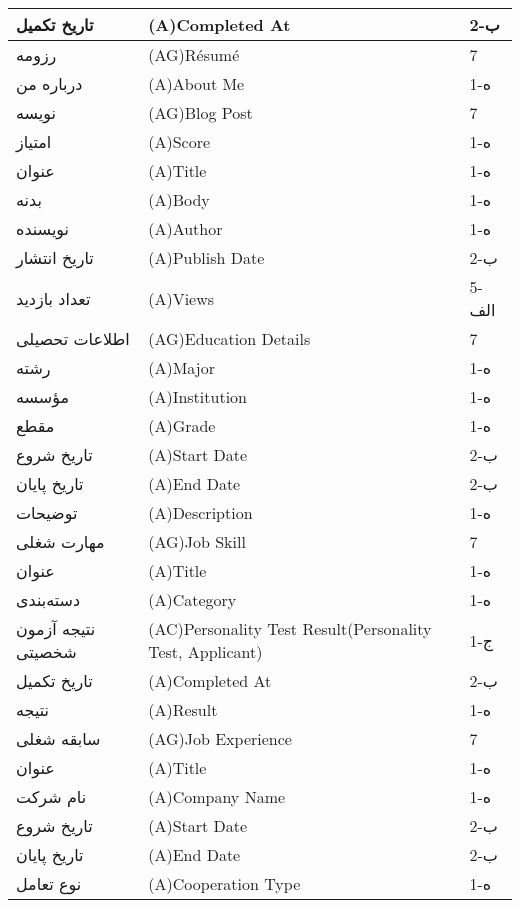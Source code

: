 \documentclass[12pt]{article}
\begin{document}
\begin{center}
\begin{table}[]
\begin{tabular}{|l|l|l|}
				\hline
				تاریخ تکمیل & (A)Completed At & 2-ب   \\
				\hline
				رزومه & (AG)Résumé & 7     \\
				\hline
				درباره من & (A)About Me & 1-ه   \\
				\hline
				نویسه & (AG)Blog Post & 7     \\
				\hline
				امتیاز & (A)Score & 1-ه   \\
				\hline
				عنوان & (A)Title & 1-ه   \\
				\hline
				بدنه & (A)Body & 1-ه   \\
				\hline
				نویسنده & (A)Author & 1-ه   \\
				\hline
				تاریخ انتشار & (A)Publish Date & 2-ب   \\
				\hline
				تعداد بازدید & (A)Views & 5-الف \\
				\hline
				اطلاعات تحصیلی & (AG)Education Details & 7     \\
				\hline
				رشته & (A)Major & 1-ه   \\
				\hline
				مؤسسه & (A)Institution & 1-ه   \\
				\hline
				مقطع & (A)Grade & 1-ه   \\
				\hline
				تاریخ شروع & (A)Start Date & 2-ب   \\
				\hline
				تاریخ پایان & (A)End Date & 2-ب   \\
				\hline
				توضیحات & (A)Description & 1-ه   \\
				\hline
				مهارت شغلی & (AG)Job Skill & 7     \\
				\hline
				عنوان & (A)Title & 1-ه   \\
				\hline
				دسته‌بندی & (A)Category & 1-ه   \\
				\hline
				نتیجه آزمون شخصیتی & (AC)Personality Test Result(Personality Test, Applicant) & 1-ج   \\
				\hline
				تاریخ تکمیل & (A)Completed At & 2-ب   \\
				\hline
				نتیجه & (A)Result & 1-ه   \\
				\hline
				سابقه شغلی & (AG)Job Experience & 7     \\
				\hline
				عنوان & (A)Title & 1-ه   \\
				\hline
				نام شرکت & (A)Company Name & 1-ه   \\
				\hline
				تاریخ شروع & (A)Start Date & 2-ب   \\
				\hline
				تاریخ پایان & (A)End Date & 2-ب   \\
				\hline
				نوع تعامل & (A)Cooperation Type & 1-ه   \\

\end{tabular}
\end{table}
\end{center}
\end{document}
